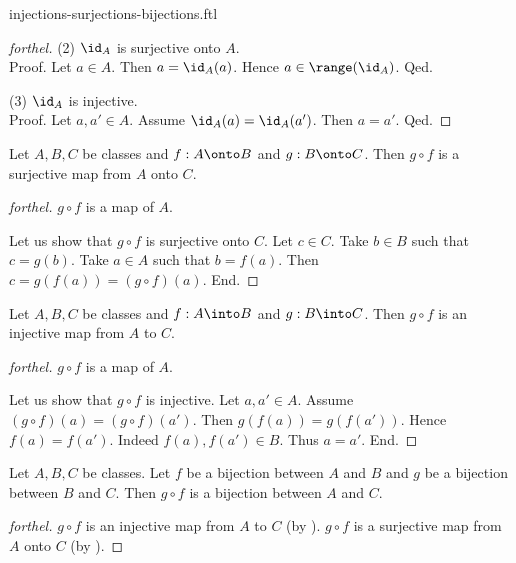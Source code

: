 \documentclass{naproche-library}
\begin{document}
\begin{smodule}{injections-surjections-bijections.ftl}
\begin{proof}[forthel]
    (2) $\id_{A}$ is surjective onto $A$. \\
    Proof.
      Let $a \in A$.
      Then $a = \id_{A}(a)$.
      Hence $a \in \range(\id_{A})$.
    Qed.

    (3) $\id_{A}$ is injective. \\
    Proof.
      Let $a, a' \in A$.
      Assume $\id_{A}(a) = \id_{A}(a')$.
      Then $a = a'$.
    Qed.
  \end{proof}

  \begin{proposition}[forthel,id=FOUNDATIONS_08_8542698338254848]
    Let $A, B, C$ be classes and $f : A \onto B$ and $g : B \onto C$.
    Then $g \circ f$ is a surjective map from $A$ onto $C$.
  \end{proposition}
  \begin{proof}[forthel]
    $g \circ f$ is a map of $A$.

    Let us show that $g \circ f$ is surjective onto $C$.
      Let $c \in C$.
      Take $b \in B$ such that $c = g(b)$.
      Take $a \in A$ such that $b = f(a)$.
      Then $c = g(f(a)) = (g \circ f)(a)$.
    End.
  \end{proof}

  \begin{proposition}[forthel,id=FOUNDATIONS_08_3367836856614912]
    Let $A, B, C$ be classes and $f : A \into B$ and $g : B \into C$.
    Then $g \circ f$ is an injective map from $A$ to $C$.
  \end{proposition}
  \begin{proof}[forthel]
    $g \circ f$ is a map of $A$.

    Let us show that $g \circ f$ is injective.
      Let $a, a' \in A$.
      Assume $(g \circ f)(a) = (g \circ f)(a')$.
      Then $g(f(a)) = g(f(a'))$.
      Hence $f(a) = f(a')$.
      Indeed $f(a), f(a') \in B$.
      Thus $a = a'$.
    End.
  \end{proof}

  \begin{corollary}[forthel,id=FOUNDATIONS_08_6435206693126144]
    Let $A, B, C$ be classes.
    Let $f$ be a bijection between $A$ and $B$ and $g$ be a bijection between $B$ and $C$.
    Then $g \circ f$ is a bijection between $A$ and $C$.
  \end{corollary}
  \begin{proof}[forthel]
    $g \circ f$ is an injective map from $A$ to $C$ (by ).
    $g \circ f$ is a surjective map from $A$ onto $C$ (by ).
  \end{proof}


\end{smodule}
\end{document}
